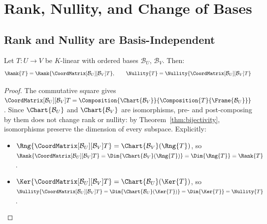 
\newpage
\section{Rank, Nullity, and Change of Bases}
\label{sec:rank-nullity-change-of-bases}

\subsection{Rank and Nullity are Basis-Independent}

\begin{theorem}
\label{thm:rank-nullity-invariance}
    Let $T: U \to V$ be $K$-linear with ordered bases $\mathcal{B}_U$, $\mathcal{B}_V$.
    Then:
    \[
        \Rank{T} = \Rank{\CoordMatrix[\mathcal{B}_U][\mathcal{B}_V]{T}},
        \qquad
        \Nullity{T} = \Nullity{\CoordMatrix[\mathcal{B}_U][\mathcal{B}_V]{T}}
    \]
\end{theorem}

\begin{proof}
    The commutative square gives
    $\CoordMatrix[\mathcal{B}_U][\mathcal{B}_V]{T}
    = \Composition{\Chart{\mathcal{B}_V}}{\Composition{T}{\Frame{\mathcal{B}_U}}}$.
    Since $\Chart{\mathcal{B}_U}$ and $\Chart{\mathcal{B}_V}$ are isomorphisms, pre- and
    post-composing by them does not change rank or nullity: by
    Theorem~\ref{thm:bijectivity}, isomorphisms preserve the dimension of every subspace.
    Explicitly:
    \begin{itemize}
        \item $\Rng{\CoordMatrix[\mathcal{B}_U][\mathcal{B}_V]{T}}
              = \Chart{\mathcal{B}_V}(\Rng{T})$, so
              $\Rank{\CoordMatrix[\mathcal{B}_U][\mathcal{B}_V]{T}}
              = \Dim{\Chart{\mathcal{B}_V}(\Rng{T})}
              = \Dim{\Rng{T}}
              = \Rank{T}$.
        \item $\Ker{\CoordMatrix[\mathcal{B}_U][\mathcal{B}_V]{T}}
              = \Chart{\mathcal{B}_U}(\Ker{T})$, so
              $\Nullity{\CoordMatrix[\mathcal{B}_U][\mathcal{B}_V]{T}}
              = \Dim{\Chart{\mathcal{B}_U}(\Ker{T})}
              = \Dim{\Ker{T}}
              = \Nullity{T}$. \qedhere
    \end{itemize}
\end{proof}

